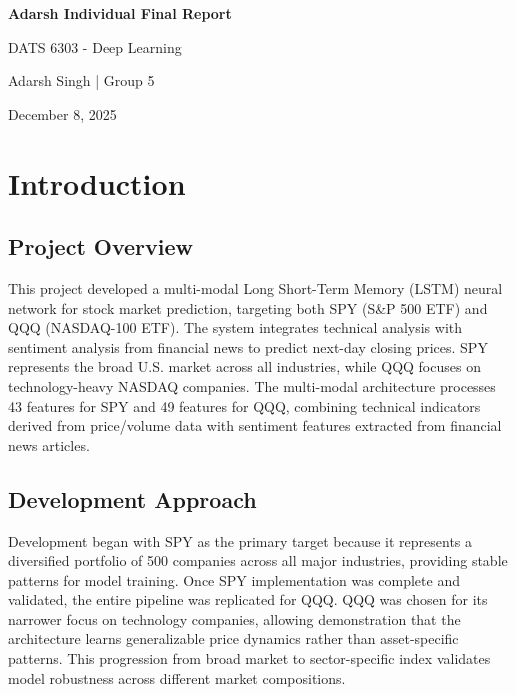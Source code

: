 \documentclass[12pt,letterpaper]{article}
\begin{document}
\begin{titlepage}
    \centering
    \vspace*{2cm}
    
    {\Huge\bfseries Adarsh Individual Final Report\par}
    \vspace{1cm}
    {\Large DATS 6303 - Deep Learning\par}
    \vspace{2cm}
    {\Large Adarsh Singh | Group 5\par}
    \vspace{0.5cm}
    {\large December 8, 2025\par}
    
    \vfill
\end{titlepage}



\section{Introduction}

\subsection{Project Overview}

This project developed a multi-modal Long Short-Term Memory (LSTM) neural network for stock market prediction, targeting both SPY (S\&P 500 ETF) and QQQ (NASDAQ-100 ETF). The system integrates technical analysis with sentiment analysis from financial news to predict next-day closing prices. SPY represents the broad U.S. market across all industries, while QQQ focuses on technology-heavy NASDAQ companies. The multi-modal architecture processes 43 features for SPY and 49 features for QQQ, combining technical indicators derived from price/volume data with sentiment features extracted from financial news articles.

\subsection{Development Approach}

Development began with SPY as the primary target because it represents a diversified portfolio of 500 companies across all major industries, providing stable patterns for model training. Once SPY implementation was complete and validated, the entire pipeline was replicated for QQQ. QQQ was chosen for its narrower focus on technology companies, allowing demonstration that the architecture learns generalizable price dynamics rather than asset-specific patterns. This progression from broad market to sector-specific index validates model robustness across different market compositions.
\end{document}

